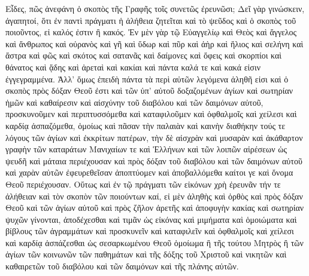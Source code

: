 \documentclass[10pt]{book}
\newcommand{\switchgreek}[1][]{\selectlanguage{polutonikogreek} \switchcolumn*[#1]}
\newcommand{\switchenglish}{\selectlanguage{english} \switchcolumn}
\begin{document}
\begin{paracol}{2}
\switchgreek

Εἶδες, πῶς ἀνεφάνη ὁ σκοπὸς τῆς Γραφῆς τοῖς συνετῶς ἐρευνῶσι; Δεῖ γὰρ
γινώσκειν, ἀγαπητοί, ὅτι ἐν παντὶ πράγματι ἡ ἀλήθεια ζητεῖται καὶ τὸ ψεῦδος
καὶ ὁ σκοπὸς τοῦ ποιοῦντος, εἰ καλός ἐστιν ἢ κακός. Ἐν μὲν γὰρ τῷ Εὐαγγελίῳ
καὶ Θεὸς καὶ ἄγγελος καὶ ἄνθρωπος καὶ οὐρανὸς καὶ γῆ καὶ ὕδωρ καὶ πῦρ καὶ ἀὴρ
καὶ ἥλιος καὶ σελήνη καὶ ἄστρα καὶ φῶς καὶ σκότος καὶ σατανᾶς καὶ δαίμονες καὶ
ὄφεις καὶ σκορπίοι καὶ θάνατος καὶ ᾅδης καὶ ἀρεταὶ καὶ κακίαι καὶ πάντα καλά
τε καὶ κακά εἰσιν ἐγγεγραμμένα. Ἀλλ’ ὅμως ἐπειδὴ πάντα τὰ περὶ αὐτῶν λεγόμενα
ἀληθῆ εἰσι καὶ ὁ σκοπὸς πρὸς δόξαν Θεοῦ ἐστι καὶ τῶν ὑπ’ αὐτοῦ δοξαζομένων
ἁγίων καὶ σωτηρίαν ἡμῶν καὶ καθαίρεσιν καὶ αἰσχύνην τοῦ διαβόλου καὶ τῶν
δαιμόνων αὐτοῦ, προσκυνοῦμεν καὶ περιπτυσσόμεθα καὶ καταφιλοῦμεν καὶ ὀφθαλμοῖς
καὶ χείλεσι καὶ καρδίᾳ ἀσπαζόμεθα, ὁμοίως καὶ πᾶσαν τὴν παλαιὰν καὶ καινὴν
διαθήκην τούς τε λόγους τῶν ἁγίων καὶ ἐκκρίτων πατέρων, τὴν δὲ αἰσχρὰν καὶ
μυσαρὰν καὶ ἀκάθαρτον γραφὴν τῶν καταράτων Μανιχαίων τε καὶ Ἑλλήνων καὶ τῶν
λοιπῶν αἱρέσεων ὡς ψευδῆ καὶ μάταια περιέχουσαν καὶ πρὸς δόξαν τοῦ διαβόλου
καὶ τῶν δαιμόνων αὐτοῦ καὶ χαρὰν αὐτῶν ἐφευρεθεῖσαν ἀποπτύομεν καὶ
ἀποβαλλόμεθα καίτοι γε καὶ ὄνομα Θεοῦ περιέχουσαν. Οὕτως καὶ ἐν τῷ πράγματι
τῶν εἰκόνων χρὴ ἐρευνᾶν τήν τε ἀλήθειαν καὶ τὸν σκοπὸν τῶν ποιούντων καί, εἰ
μὲν ἀληθὴς καὶ ὀρθὸς καὶ πρὸς δόξαν Θεοῦ καὶ τῶν ἁγίων αὐτοῦ καὶ πρὸς ζῆλον
ἀρετῆς καὶ ἀποφυγὴν κακίας καὶ σωτηρίαν ψυχῶν γίνονται, ἀποδέχεσθαι καὶ τιμᾶν
ὡς εἰκόνας καὶ μιμήματα καὶ ὁμοιώματα καὶ βίβλους τῶν ἀγραμμάτων καὶ
προσκυνεῖν καὶ καταφιλεῖν καὶ ὀφθαλμοῖς καὶ χείλεσι καὶ καρδίᾳ ἀσπάζεσθαι ὡς
σεσαρκωμένου Θεοῦ ὁμοίωμα ἢ τῆς τούτου Μητρὸς ἢ τῶν ἁγίων τῶν κοινωνῶν τῶν
παθημάτων καὶ τῆς δόξης τοῦ Χριστοῦ καὶ νικητῶν καὶ καθαιρετῶν τοῦ διαβόλου
καὶ τῶν δαιμόνων καὶ τῆς πλάνης αὐτῶν.

\switchenglish


\end{paracol}
\end{document}
